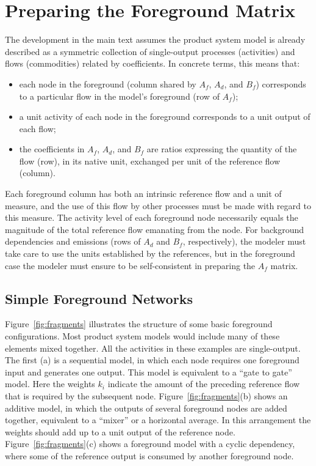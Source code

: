 \section{Preparing the Foreground Matrix}

The development in the main text assumes the product system model is already described as a symmetric collection of single-output processes (activities) and flows (commodities) related by coefficients.  In concrete terms, this means that:
\begin{itemize}
\item each node in the foreground (column shared by $A_f$, $A_d$, and $B_f$) corresponds to a particular flow in the model's foreground (row of $A_f$);
\item a unit activity of each node in the foreground corresponds to a unit output of each flow;
\item the coefficients in $A_f$, $A_d$, and $B_f$ are ratios expressing the quantity of the flow (row), in its native unit, exchanged per unit of the reference flow (column). 
\end{itemize}

Each foreground column has both an intrinsic reference flow and a unit of measure, and the use of this flow by other processes must be made with regard to this measure.  The activity level of each foreground node necessarily equals the magnitude of the total reference flow emanating from the node.  For background dependencies and emissions (rows of $A_d$ and $B_f$, respectively), the modeler must take care to use the units established by the references, but in the foreground case the modeler must ensure to be self-consistent in preparing the $A_f$ matrix. 


\subsection{Simple Foreground Networks}



Figure~\ref{fig:fragments} illustrates the structure of some basic foreground configurations.  Most product system models would include many of these elements mixed together.  All the activities in these examples are single-output.
The first (a) is a sequential model, in which each node requires one foreground input and generates one output. This model is equivalent to a ``gate to gate'' model.  Here the weights $k_i$ indicate the amount of the preceding reference flow that is required by the subsequent node.  Figure~\ref{fig:fragments}(b) shows an additive model, in which the outputs of several foreground nodes are added together, equivalent to a ``mixer'' or a horizontal average.  In this arrangement the weights %
should add up to a unit output of the reference node.  Figure~\ref{fig:fragments}(c) shows a foreground model with a cyclic dependency, where some of the reference output is consumed by another foreground node.

